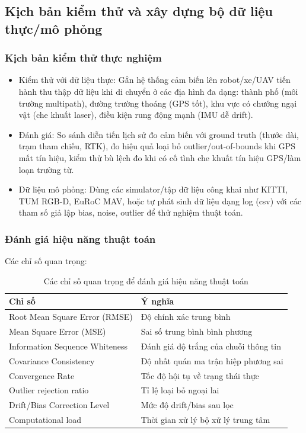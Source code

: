 \subsection{Kịch bản kiểm thử và xây dựng bộ dữ liệu thực/mô phỏng}
\subsubsection{Kịch bản kiểm thử thực nghiệm}
\begin{itemize}
    \item Kiểm thử với dữ liệu thực: Gắn hệ thống cảm biến lên robot/xe/UAV tiến hành thu thập dữ liệu khi di chuyển ở các địa hình đa dạng: thành phố (môi trường multipath), đường trường thoáng (GPS tốt), khu vực có chướng ngại vật (che khuất laser), điều kiện rung động mạnh (IMU dễ drift).
    \item Đánh giá: So sánh diễn tiến lịch sử đo cảm biến với ground truth (thước dài, trạm tham chiếu, RTK), đo hiệu quả loại bỏ outlier/out-of-bounds khi GPS mất tín hiệu, kiểm thử bù lệch đo khi có cố tình che khuất tín hiệu GPS/làm loạn trường từ.
    \item Dữ liệu mô phỏng: Dùng các simulator/tập dữ liệu công khai như KITTI, TUM RGB-D, EuRoC MAV, hoặc tự phát sinh dữ liệu dạng log (csv) với các tham số giả lập bias, noise, outlier để thử nghiệm thuật toán.
\end{itemize}
\subsubsection{Đánh giá hiệu năng thuật toán}
Các chỉ số quan trọng:


\begin{table}[h!]
\centering
\begin{tabular}{|l|p{8cm}|}
\hline
\textbf{Chỉ số} & \textbf{Ý nghĩa} \\
\hline
Root Mean Square Error (RMSE) & Độ chính xác trung bình \\
\hline
Mean Square Error (MSE) & Sai số trung bình bình phương \\
\hline
Information Sequence Whiteness & Đánh giá độ trắng của chuỗi thông tin \\
\hline
Covariance Consistency & Độ nhất quán ma trận hiệp phương sai \\
\hline
Convergence Rate & Tốc độ hội tụ về trạng thái thực \\
\hline
Outlier rejection ratio & Tỉ lệ loại bỏ ngoại lai \\
\hline
Drift/Bias Correction Level & Mức độ drift/bias sau lọc \\
\hline
Computational load & Thời gian xử lý bộ xử lý trung tâm \\
\hline
\end{tabular}
\caption{Các chỉ số quan trọng để đánh giá hiệu năng thuật toán}
\end{table}


